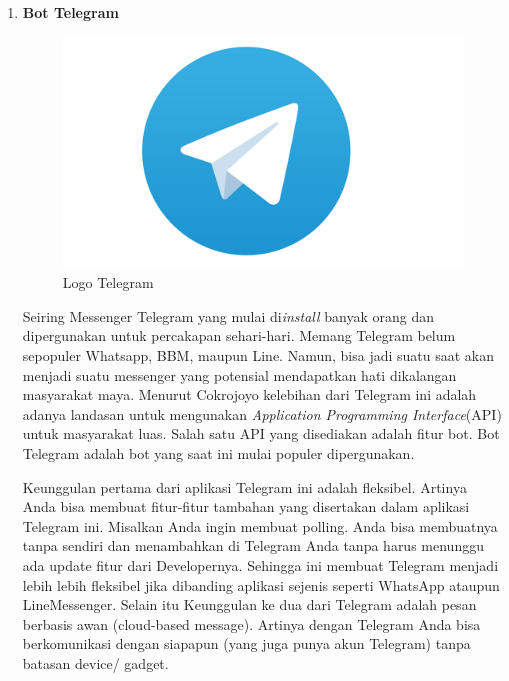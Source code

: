\begin{enumerate}
\item \textbf{Bot Telegram}
\begin{figure}[H]
\centering
\includegraphics[width=1.4 \textwidth]{figures/telegram.png}
\caption{Logo Telegram}
\label{print}
\end{figure}
\par Seiring Messenger Telegram yang mulai di\textit{install} banyak orang dan dipergunakan untuk percakapan sehari-hari. Memang Telegram belum sepopuler Whatsapp, BBM, maupun Line. Namun, bisa jadi suatu saat akan menjadi suatu messenger yang potensial mendapatkan hati dikalangan masyarakat maya. Menurut Cokrojoyo kelebihan dari Telegram ini adalah adanya landasan untuk mengunakan \textit{Application Programming Interface}(API) untuk masyarakat luas. Salah satu API yang disediakan adalah fitur bot. Bot Telegram adalah bot yang saat ini mulai populer dipergunakan.
\par Keunggulan pertama dari aplikasi Telegram ini adalah fleksibel. Artinya Anda bisa membuat fitur-fitur tambahan yang disertakan dalam aplikasi Telegram ini. Misalkan Anda ingin membuat polling. Anda bisa membuatnya tanpa sendiri dan menambahkan di Telegram Anda tanpa harus menunggu ada update fitur dari Developernya. Sehingga ini membuat Telegram menjadi lebih lebih fleksibel jika dibanding aplikasi sejenis seperti WhatsApp ataupun LineMessenger. Selain itu Keunggulan ke dua dari Telegram adalah pesan berbasis awan (cloud-based message). Artinya dengan Telegram Anda bisa berkomunikasi dengan siapapun (yang juga punya akun Telegram) tanpa batasan device/ gadget.


\end{enumerate}
